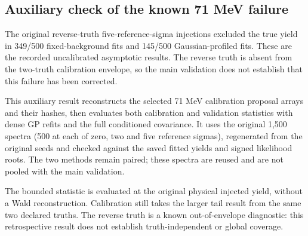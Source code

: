 \subsection{Auxiliary check of the known 71 MeV failure}\label{sec:reverse_truth_validation}

The original reverse-truth five-reference-sigma injections excluded the true yield in 349/500 fixed-background fits and 145/500 Gaussian-profiled fits. These are the recorded uncalibrated asymptotic results. The reverse truth is absent from the two-truth calibration envelope, so the main validation does not establish that this failure has been corrected.

This auxiliary result reconstructs the selected 71 MeV calibration proposal arrays and their hashes, then evaluates both calibration and validation statistics with dense GP refits and the full conditioned covariance. It uses the original 1,500 spectra (500 at each of zero, two and five reference sigmas), regenerated from the original seeds and checked against the saved fitted yields and signed likelihood roots. The two methods remain paired; these spectra are reused and are not pooled with the main validation.

The bounded statistic is evaluated at the original physical injected yield, without a Wald reconstruction. Calibration still takes the larger tail result from the same two declared truths. The reverse truth is a known out-of-envelope diagnostic: this retrospective result does not establish truth-independent or global coverage.

